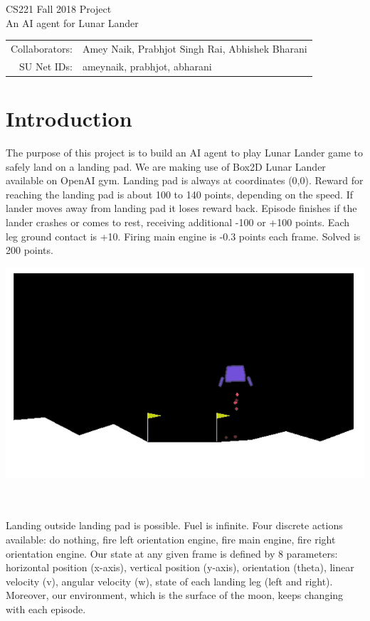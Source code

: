 \documentclass[12pt]{article}
\begin{document}
\begin{center}
{\Large CS221 Fall 2018 Project} \\
{\Large An AI agent for Lunar Lander}

\begin{tabular}{rl}
Collaborators: & Amey Naik, Prabhjot Singh Rai, Abhishek Bharani \\
SU Net IDs: & ameynaik, prabhjot, abharani
\end{tabular}
\end{center}


\section{Introduction}

\noindent\begin{minipage}{0.6\textwidth}
The purpose of this project is to build an AI agent to play Lunar Lander game to safely land on a landing pad. We are making use of Box2D Lunar Lander available on OpenAI gym. Landing pad is always at coordinates (0,0). Reward for reaching the landing pad is about 100 to 140 points, depending on the speed. If lander moves away from landing pad it loses reward back. Episode finishes if the lander crashes or comes to rest, receiving additional -100 or +100 points. Each leg ground contact is +10. Firing main engine is -0.3 points each frame. Solved is 200 points.
\end{minipage}
\begin{minipage}{0.3\textwidth}\raggedleft
{}
\includegraphics[scale=0.3]{LunarLanderDemoImage.png}
\end{minipage}
\\ \\
Landing outside landing pad is possible. Fuel is infinite. Four discrete actions available: do nothing, fire left orientation engine, fire main engine, fire right orientation engine. Our state at any given frame is defined by 8 parameters: horizontal position (x-axis), vertical position (y-axis), orientation (theta), linear velocity (v), angular velocity (w), state of each landing leg (left and right). Moreover, our environment, which is the surface of the moon, keeps changing with each episode.
\end{document}
